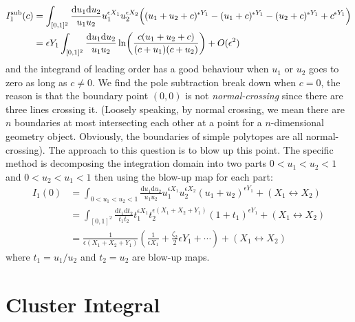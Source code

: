 \documentclass[12pt]{article}
\theoremstyle{definition}
\theoremstyle{plain}
\newcommand{\dif}{\mathrm{d}} %
\begin{document}
\begin{align}
 I_{1}^{\text{sub}}(c)&= \int_{[0,1]^{2}}\frac{\dif u_{1}\dif u_{2}}{u_{1}u_{2}} u_{1}^{\epsilon X_{1}}u_{2}^{\epsilon X_{2}} 
 \Bigl((u_{1}+u_{2}+c)^{\epsilon Y_{1}}-(u_{1}+c)^{\epsilon Y_{1}}-(u_{2}+c)^{\epsilon Y_{1}} + c^{\epsilon Y_{1}}  \Bigr) \nonumber\\
  &= \epsilon Y_{1}\int_{[0,1]^{2}} \frac{\dif u_{1}\dif u_{2}}{u_{1}u_{2}} \ln\biggl(\frac{c(u_{1}+u_{2}+c)}{(c+u_{1})(c+u_{2})}\biggr)
  +O(\epsilon^{2})  
\end{align}
and the integrand of leading order has a good behaviour when $u_{1}$ or $u_{2}$ goes to zero as long as $c\neq 0$. We find the pole subtraction break down when $c=0$, the reason is that the boundary point $(0,0)$ is not \emph{normal-crossing} since there are three lines crossing it.  (Loosely speaking, by normal crossing, we mean there are $n$ boundaries at most intersecting each other at a point for a $n$-dimensional geometry object. Obviously, the boundaries of simple polytopes are all normal-crossing). The approach to this question is to  blow up this point. The specific method is decomposing the integration domain into two parts $0<u_{1}<u_{2}<1$ and $0<u_{2}<u_{1}<1$ then using the blow-up map for each part:
\begin{align*}
    I_{1}(0) &=\int_{0<u_{1}<u_{2}<1} \frac{\dif u_{1}\dif u_{2}}{u_{1}u_{2}} u_{1}^{\epsilon X_{1}}u_{2}^{\epsilon X_{2}} (u_{1}+u_{2})^{\epsilon Y_{1}} + (X_{1}\leftrightarrow X_{2} ) \\
    &=\int_{[0,1]^{2}} \frac{\dif t_{1}\dif t_{2}}{t_{1}t_{2}} t_{1}^{\epsilon X_{1}}t_{2}^{\epsilon(X_{1}+X_{2}+Y_{1})}(1+t_{1})^{\epsilon Y_{1}} + (X_{1}\leftrightarrow X_{2} ) \\
    &=\frac{1}{\epsilon(X_{1}+X_{2}+Y_{1})}\left(\frac{1}{\epsilon X_{1}}+ \frac{\zeta_{2}}{2}\epsilon Y_{1}+\cdots\right)+ (X_{1}\leftrightarrow X_{2} )
\end{align*}
where $t_{1}=u_{1}/u_{2}$ and $t_{2}=u_{2}$ are blow-up maps.

\section{Cluster Integral}
\end{document}
